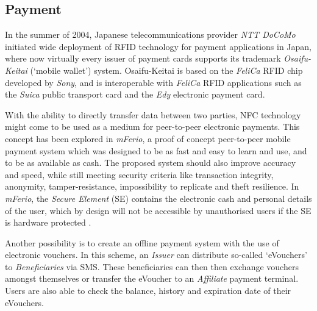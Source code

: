 

\subsection{Payment}
In the summer of 2004, Japanese telecommunications provider \textit{NTT DoCoMo} initiated wide deployment of RFID technology for payment applications in Japan, where now virtually every issuer of payment cards supports its trademark \textit{Osaifu-Keitai} (`mobile wallet') system.
Osaifu-Keitai is based on the \textit{FeliCa} RFID chip developed by \textit{Sony}, and is interoperable with \textit{FeliCa} RFID applications such as the \textit{Suica} public transport card and the \textit{Edy} electronic payment card.
\cite{yamauchi2006intensive}


With the ability to directly transfer data between two parties, NFC technology might come to be used as a medium for peer-to-peer electronic payments.
This concept has been explored in \textit{mFerio}, a proof of concept peer-to-peer mobile payment system which was designed to be as fast and easy to learn and use, and to be as available as cash.
The proposed system should also improve accuracy and speed, while still meeting security criteria like transaction integrity, anonymity, tamper-resistance, impossibility to replicate and theft resilience. 
In \textit{mFerio}, the \textit{Secure Element} (SE) contains the electronic cash and personal details of the user, which by design will not be accessible by unauthorised users if the SE is hardware protected \cite{1555846}.

Another possibility is to create an offline payment system with the use of electronic vouchers.
In this scheme, an \textit{Issuer} can distribute so-called `eVouchers' to \textit{Beneficiaries} via SMS.
These beneficiaries can then then exchange vouchers amongst themselves or transfer the eVoucher to an \textit{Affiliate} payment terminal.
Users are also able to check the balance, history and expiration date of their eVouchers. 

